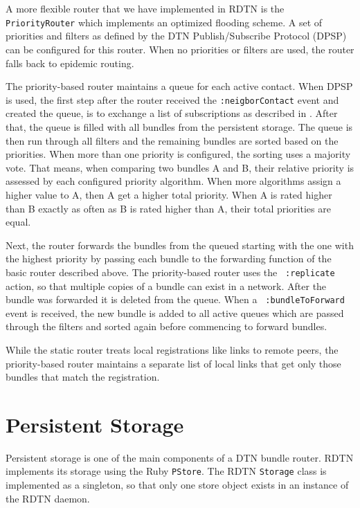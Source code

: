 \documentclass{article}
\begin{document}
A more flexible router that we have implemented in RDTN is the {\tt
PriorityRouter} which implements an optimized flooding scheme. A set of
priorities and filters as defined by the DTN Publish/Subscribe Protocol (DPSP)
can be configured for this router. When no priorities or filters are used, the
router falls back to epidemic routing.

The priority-based router maintains a queue for each active contact. When DPSP
is used, the first step after the router received the {\tt :neigborContact}
event and created the queue, is to exchange a list of subscriptions as described
in \cite{dtn-pubsub}. After that, the queue is filled with all bundles from the
persistent storage. The queue is then run through all filters and the remaining
bundles are sorted based on the priorities. When more than one priority is
configured, the sorting uses a majority vote. That means, when comparing two
bundles A and B, their relative priority is assessed by each configured priority
algorithm. When more algorithms assign a higher value to A, then A get a higher
total priority. When A is rated higher than B exactly as often as B is rated
higher than A, their total priorities are equal.

Next, the router forwards the bundles from the queued starting with the one with
the highest priority by passing each bundle to the forwarding function of the
basic router described above. The priority-based router uses the {\tt
:replicate} action, so that multiple copies of a bundle can exist in a network.
After the bundle was forwarded it is deleted from the queue. When a {\tt
:bundleToForward} event is received, the new bundle is added to all active
queues which are passed through the filters and sorted again before commencing
to forward bundles.

While the static router treats local registrations like links to remote peers,
the priority-based router maintains a separate list of local links that get only
those bundles that match the registration.

\section{Persistent Storage}\label{sec.storage}

Persistent storage is one of the main components of a DTN bundle router. RDTN
implements its storage using the Ruby {\tt PStore}. The RDTN {\tt Storage}
class is implemented as a singleton, so that only one store object exists in an
instance of the RDTN daemon.
\end{document}
